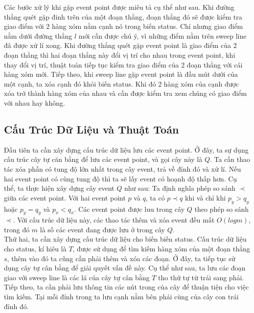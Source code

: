 \documentclass[15pt]{article}
\begin{document}
Các bước xử lý khi gặp event point được miêu tả cụ thể như sau. Khi đường thẳng quét gặp đinh trên của một đoạn thẳng, đoạn thẳng đó sẽ được kiểm tra giao điểm với 2 hàng xóm nằm cạnh nó trong biến status. Chỉ nhưng giao điểm nằm dưới đường thẳng $l$ mới cần được chú ý, vì những điểm nằm trên sweep line đã được xử lí xong. Khi đường thẳng quét gặp event point là giao điểm của 2 đoạn thẳng thì hai đoạn thẳng này đổi vị trí cho nhau trong event point, khi thay đổi vị trí, thuật toán tiếp tục kiểm tra giao điểm của 2 đoạn thẳng với cái hàng xóm mới. Tiếp theo, khi sweep line gặp event point là đầu mút dưới của một cạnh, ta xóa cạnh đó khỏi biến status. Khi đó 2 hàng xóm của cạnh được xóa trở thành hàng xóm của nhau và cần được kiểm tra xem chúng có giao điểm với nhau hay không. \\

\subsection{Cấu Trúc Dữ Liệu và Thuật Toán}
Đầu tiên ta cần xây dựng cấu trúc dữ liệu lưu các event point. Ở đây, ta sự dụng cấu trúc cây tự căn bằng để lưu các event point, và gọi cây này là $Q$. Ta cần thao tác xóa phần có tung độ lớn nhất trong cây event, trả về đỉnh đó và xử lí. Nếu hai event point có cùng tung độ thì ta sẽ lấy event có hoạnh độ thấp hơn. Cụ thể, ta thực hiện xây dựng cây event $Q$ như sau:  Ta định nghĩa phép so sánh $\prec$ giữa các event point. Với hai event point $p$ và $q$, ta có $p \prec q$ khi và chỉ khi $p_y > q_y$ hoặc $p_y = q_y$ và $p_x < q_x$. Các event point được luu trong cây $Q$ theo phép so sánh $\prec$. Với cấu trúc dữ liệu này, các thao tác thêm và xóa event đều mất $O(log m)$, trong đó $m$ là số các event đang được lưu ở trong cây $Q$. \\

Thứ hai, ta cần xây dựng cấu trúc dữ liệu cho biến biến status. Cấu trúc dữ liệu cho status, kí hiêu là $T$, được sử dụng để tìm kiếm hàng xóm của một đoạn thẳng $s$, thêm vào đó ta cũng cần phải thêm và xóa các đoạn. Ở đây, ta tiếp tục sử dụng cây tự cân bằng để giải quyết vấn đề này. Cụ thể như sau, ta lưu các đoạn giao với sweep line là các lá của cây tự cân bằng $T$ tho thứ tự từ trái sang phải. Tiếp theo, ta cần phải lưu thông tin các nút trong của cây để thuận tiện cho việc tìm kiếm. Tại mỗi đỉnh trong ta lưu cạnh nằm bên phải cùng của cây con trái đỉnh đó.
\end{document}
